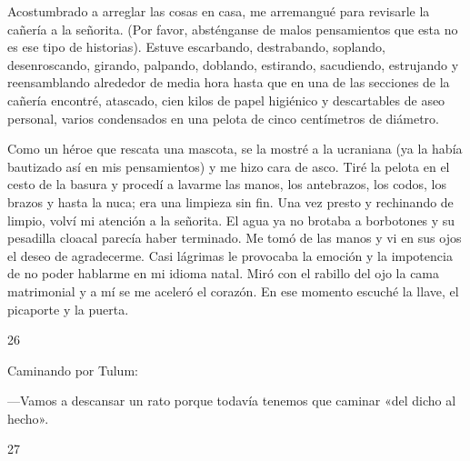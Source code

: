 \documentclass[12pt,twoside,openright,a5paper]{book}
\begin{document}
\nopagebreak

\vspace{0.5cm}

\nopagebreak

  Acostumbrado a
arreglar las cosas en casa, me arremangué para revisarle la cañería a
la señorita. (Por favor, absténganse de malos pensamientos que esta no es ese
tipo de historias). Estuve escarbando, destrabando, soplando, desenroscando,
girando, palpando, doblando, estirando, sacudiendo, estrujando y reensamblando
alrededor de media hora hasta que en una de las secciones de la cañería
encontré, atascado, cien kilos de papel higiénico y descartables de aseo
personal, varios condensados en una pelota de cinco centímetros de diámetro.

Como un héroe que rescata una mascota, se la mostré a la ucraniana (ya la
había bautizado así en mis pensamientos) y me hizo cara de asco. Tiré
la pelota en el cesto de la basura y procedí a lavarme las manos, los
antebrazos, los codos, los brazos y hasta la nuca; era una limpieza sin fin.
Una vez presto y rechinando de limpio, volví mi atención a la señorita. El
agua ya no brotaba a borbotones y su pesadilla cloacal parecía haber terminado.
Me tomó de las manos y vi en sus ojos el deseo de agradecerme. Casi
lágrimas le provocaba la emoción y la impotencia de no poder hablarme en
mi idioma natal. Miró con el rabillo del ojo la cama matrimonial y a mí
se me aceleró el corazón. En ese momento escuché la llave, el picaporte
y la puerta.

\vspace{0.5cm}

\hrulefill \hspace{0.1cm}\decofourleft\hspace{0.2cm} 26 \hspace{0.2cm}\decofourright \hspace{0.1cm}\hrulefill

\nopagebreak

\vspace{0.5cm}

\nopagebreak

Caminando por Tulum:

---Vamos a descansar un rato porque todavía tenemos que
caminar «del dicho al hecho».

\vspace{0.5cm}

\hrulefill \hspace{0.1cm}\decofourleft\hspace{0.2cm} 27 \hspace{0.2cm}\decofourright \hspace{0.1cm}\hrulefill
\end{document}
